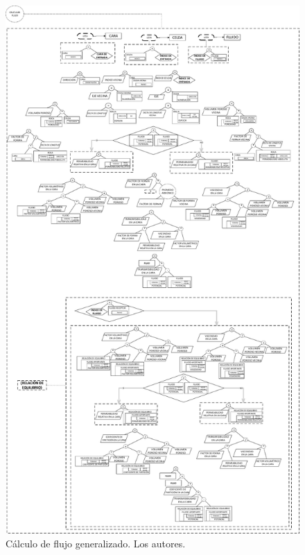\begin{figure}[h]
	\centering%
	\includegraphics[height=0.9\textheight]{Fig/CalcularFlujo.pdf}%
	\caption[Cálculo de flujo generalizado.]{Cálculo de flujo generalizado. Los autores.} \label{fig:Flow}
\end{figure}

